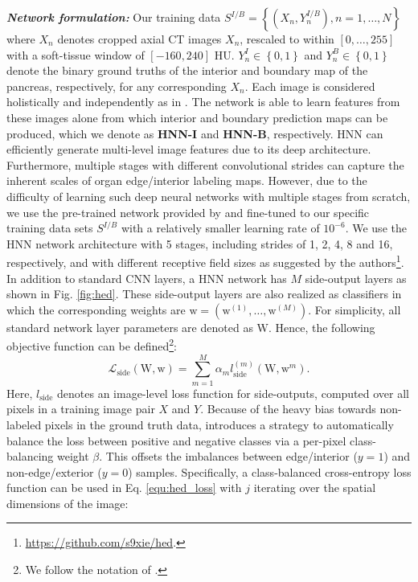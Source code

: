 \documentclass[journal]{IEEEtran}
\begin{document}
\textbf{\textit{Network formulation:}} Our training data $S^{I/B} = \left\{(X_n , Y^{I/B}_n ), n = 1, \dots, N \right\}$ where $X_n$ denotes cropped axial CT images $X_n$, rescaled to within $\left[0,\dots,255\right]$ with a soft-tissue window of $[-160, 240]$ HU. $Y^I_n \in \left\{0,1\right\}$ and $Y^B_n \in \left\{0,1\right\}$ denote the binary ground truths of the interior and boundary map of the pancreas, respectively, for any corresponding $X_n$. Each image is considered holistically and independently as in \cite{xie2015holistically}. The network is able to learn features from these images alone from which interior  and boundary prediction maps can be produced, which we denote as \textbf{HNN-I} and \textbf{HNN-B}, respectively.
HNN can efficiently generate multi-level image features due to its deep architecture. Furthermore, multiple stages with different convolutional strides can capture the inherent scales of organ edge/interior labeling maps. However, due to the difficulty of learning such deep neural networks with multiple stages from scratch, we use the pre-trained network provided by \cite{xie2015holistically} and fine-tuned to our specific training data sets $S^{I/B}$ with a relatively smaller learning rate of $10^{-6}$. We use the HNN network architecture with 5 stages, including strides of 1, 2, 4, 8 and 16, respectively, and with different receptive field sizes as suggested by the authors\footnote{\scriptsize\url{https://github.com/s9xie/hed}.}.
In addition to standard CNN layers, a HNN network has $M$ side-output layers as shown in Fig. \ref{fig:hed}. These side-output layers are also realized as classifiers in which the corresponding weights are $\bm{\mathrm{w}} = (\bm{\mathrm{w}}^{(1)},\dots ,\bm{\mathrm{w}}^{(M )})$. For simplicity, all standard network layer parameters are denoted as $\bm{\mathrm{W}}$. Hence, the following objective function can be defined\footnote{\scriptsize We follow the notation of \cite{xie2015holistically}.}:
\begin{equation}
	\mathcal{L}_\mathrm{side}(\bm{\mathrm{W}},\bm{\mathrm{w}}) = \sum^{M}_{m=1}{\alpha_m}{l_\mathrm{side}^{(m)}}(\bm{\mathrm{W}},\bm{\mathrm{w}}^{m}).
	\label{equ:hed_loss}
\end{equation}
Here, $l_\mathrm{side}$ denotes an image-level loss function for side-outputs, computed over all pixels in a training image pair $X$ and $Y$. Because of the heavy bias towards non-labeled pixels in the ground truth data, \cite{xie2015holistically} introduces a strategy to automatically balance the loss between positive and negative classes via a per-pixel class-balancing weight $\beta$. This offsets the imbalances between edge/interior ($y=1$) and non-edge/exterior ($y=0$) samples. Specifically, a class-balanced cross-entropy loss function can be used in Eq. \eqref{equ:hed_loss} with $j$ iterating over the spatial dimensions of the image:
\end{document}
